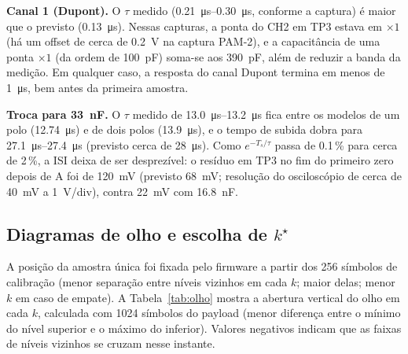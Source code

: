 \documentclass[12pt,a4paper]{article}
\begin{document}
\textbf{Canal 1 (Dupont).} O $\tau$ medido (\SIrange{0,21}{0,30}{\micro\second}, conforme a
captura) é maior que o previsto (\SI{0,13}{\micro\second}). Nessas capturas, a ponta do CH2 em TP3
estava em $\times 1$ (há um offset de cerca de \SI{0,2}{V} na captura PAM-2), e a capacitância de uma
ponta $\times 1$ (da ordem de \SI{100}{pF}) soma-se aos \SI{390}{pF}, além de reduzir a banda da
medição. Em qualquer caso, a resposta do canal Dupont termina em menos de \SI{1}{\micro\second},
bem antes da primeira amostra.

\textbf{Troca para \SI{33}{nF}.} O $\tau$ medido de \SIrange{13,0}{13,2}{\micro\second} fica entre os
modelos de um polo (\SI{12,74}{\micro\second}) e de dois polos (\SI{13,9}{\micro\second}), e o tempo
de subida dobra para \SIrange{27,1}{27,4}{\micro\second} (previsto cerca de \SI{28}{\micro\second}).
Como $e^{-T_s/\tau}$ passa de \num{0.1}\,\% para cerca de 2\,\%, a ISI deixa de ser desprezível: o
resíduo em TP3 no fim do primeiro zero depois de A foi de \SI{+120}{mV} (previsto \SI{68}{mV};
resolução do osciloscópio de cerca de \SI{40}{mV} a \SI{1}{V/div}), contra \SI{+22}{mV} com
\SI{16,8}{nF}.

\subsection{Diagramas de olho e escolha de $k^\star$}

A posição da amostra única foi fixada pelo firmware a partir dos 256 símbolos de calibração (menor
separação entre níveis vizinhos em cada $k$; maior delas; menor $k$ em caso de empate). A
Tabela~\ref{tab:olho} mostra a abertura vertical do olho em cada $k$, calculada com \num{1024}
símbolos do payload (menor diferença entre o mínimo do nível superior e o máximo do inferior).
Valores negativos indicam que as faixas de níveis vizinhos se cruzam nesse instante.
\end{document}
